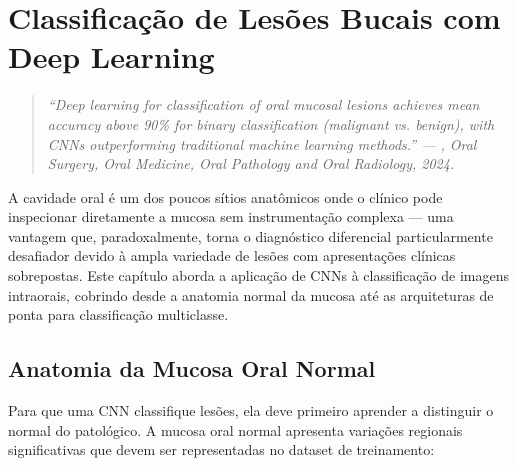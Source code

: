 
\chapter{Classificação de Lesões Bucais com Deep Learning}
\label{cap:lesoes-bucais}

\niveltres

\begin{quote}
\itshape\small
``Deep learning for classification of oral mucosal lesions achieves mean accuracy
above 90\% for binary classification (malignant vs. benign), with CNNs outperforming
traditional machine learning methods.'' --- , Oral Surgery,
Oral Medicine, Oral Pathology and Oral Radiology, 2024.
\end{quote}

A cavidade oral é um dos poucos sítios anatômicos onde o clínico pode inspecionar
diretamente a mucosa sem instrumentação complexa --- uma vantagem que, paradoxalmente,
torna o diagnóstico diferencial particularmente desafiador devido à ampla variedade
de lesões com apresentações clínicas sobrepostas. Este capítulo aborda a aplicação
de CNNs à classificação de imagens intraorais, cobrindo desde a anatomia normal
da mucosa até as arquiteturas de ponta para classificação multiclasse.


\section{Anatomia da Mucosa Oral Normal}
\label{sec:mucosa-normal}

Para que uma CNN classifique lesões, ela deve primeiro aprender a distinguir o
normal do patológico. A mucosa oral normal apresenta variações regionais
significativas que devem ser representadas no dataset de treinamento:

